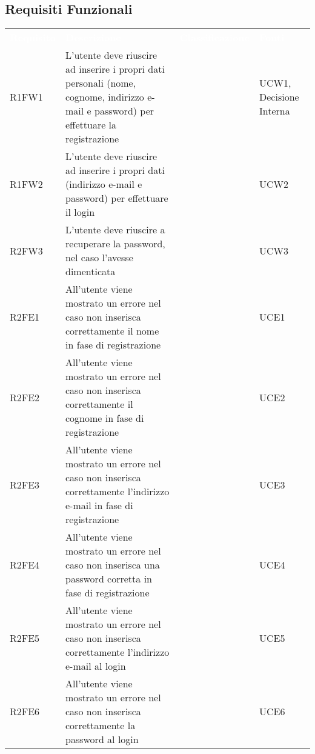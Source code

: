 \subsection{Requisiti Funzionali}


\renewcommand{\arraystretch}{1.5}
\begin{longtable}{ m{}<{\centering}  m{}<{\centering}  m{}<{\centering}  m{}<{\centering}}
	\rowcolor{darkblue}
	\textcolor{white}{\textbf{Requisito}} &\textcolor{white}{\textbf{Descrizione}}& \textcolor{white}{\textbf{Classificazione}} & \textcolor{white}{\textbf{Fonti}}\\ 

	R1FW1 & L’utente deve riuscire ad inserire i propri dati personali (nome, cognome, indirizzo e-mail e password) per effettuare la registrazione & \Ob & UCW1, Decisione Interna\\	
	 
	R1FW2 & L’utente deve riuscire ad inserire i propri dati (indirizzo e-mail e password) per effettuare il login & \Ob & UCW2\\	

	R2FW3 & L’utente deve riuscire a recuperare la password, nel caso l’avesse dimenticata & \De & UCW3\\	
	 
	R2FE1 & All’utente viene mostrato un errore nel caso non inserisca correttamente il nome in fase di registrazione & \De & UCE1\\	
	 
 	R2FE2 & All’utente viene mostrato un errore nel caso non inserisca correttamente il cognome in fase di registrazione & \De & UCE2\\	
	 
	R2FE3 & All’utente viene mostrato un errore nel caso non inserisca correttamente l’indirizzo e-mail in fase di registrazione & \De & UCE3\\	

	R2FE4 & All’utente viene mostrato un errore nel caso non inserisca una password corretta in fase di registrazione & \De & UCE4\\	
	
	R2FE5 & All'utente viene mostrato un errore nel caso non inserisca correttamente l'indirizzo e-mail al login & \De & UCE5 \\
	 
	R2FE6 & All'utente viene mostrato un errore nel caso non inserisca correttamente la password al login & \De & UCE6 \\	 
	 

\end{longtable}
